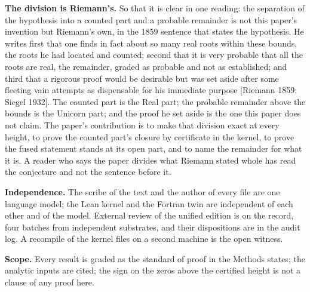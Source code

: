 \documentclass[10pt]{article}
\begin{document}
\textbf{The division is Riemann's.} So that it is clear in one reading:
the separation of the hypothesis into a counted part and a probable
remainder is not this paper's invention but Riemann's own, in the 1859
sentence that states the hypothesis. He writes first that one finds in
fact about so many real roots within these bounds, the roots he had
located and counted; second that it is very probable that all the roots
are real, the remainder, graded as probable and not as established; and
third that a rigorous proof would be desirable but was set aside after
some fleeting vain attempts as dispensable for his immediate purpose
{[}Riemann 1859; Siegel 1932{]}. The counted part is the Real part; the
probable remainder above the bounds is the Unicorn part; and the proof
he set aside is the one this paper does not claim. The paper's
contribution is to make that division exact at every height, to prove
the counted part's closure by certificate in the kernel, to prove the
fused statement stands at its open part, and to name the remainder for
what it is. A reader who says the paper divides what Riemann stated
whole has read the conjecture and not the sentence before it.

\textbf{Independence.} The scribe of the text and the author of every
file are one language model; the Lean kernel and the Fortran twin are
independent of each other and of the model. External review of the
unified edition is on the record, four batches from independent
substrates, and their dispositions are in the audit log. A recompile of
the kernel files on a second machine is the open witness.

\textbf{Scope.} Every result is graded as the standard of proof in the
Methods states; the analytic inputs are cited; the sign on the zeros
above the certified height is not a clause of any proof here.
\end{document}
